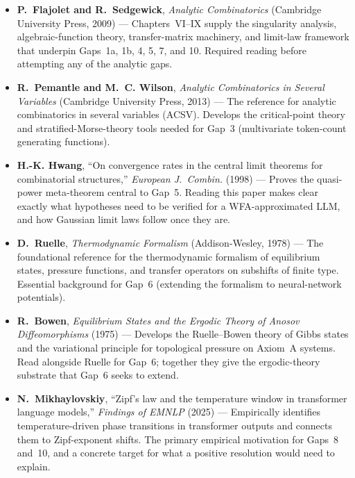 \begin{itemize}
  \item \textbf{P.~Flajolet and R.~Sedgewick}, \emph{Analytic Combinatorics} (Cambridge University Press, 2009) \cite{FlajoletSedgewick2009} --- Chapters~VI--IX supply the singularity analysis, algebraic-function theory, transfer-matrix machinery, and limit-law framework that underpin Gaps~1a, 1b, 4, 5, 7, and 10. Required reading before attempting any of the analytic gaps.

  \item \textbf{R.~Pemantle and M.~C. Wilson}, \emph{Analytic Combinatorics in Several Variables} (Cambridge University Press, 2013) \cite{PemantleWilson2013} --- The reference for analytic combinatorics in several variables (ACSV). Develops the critical-point theory and stratified-Morse-theory tools needed for Gap~3 (multivariate token-count generating functions).

  \item \textbf{H.-K. Hwang}, ``On convergence rates in the central limit theorems for combinatorial structures,'' \emph{European J.\ Combin.} (1998) \cite{Hwang1998} --- Proves the quasi-power meta-theorem central to Gap~5. Reading this paper makes clear exactly what hypotheses need to be verified for a WFA-approximated LLM, and how Gaussian limit laws follow once they are.

  \item \textbf{D.~Ruelle}, \emph{Thermodynamic Formalism} (Addison-Wesley, 1978) \cite{Ruelle1978} --- The foundational reference for the thermodynamic formalism of equilibrium states, pressure functions, and transfer operators on subshifts of finite type. Essential background for Gap~6 (extending the formalism to neural-network potentials).

  \item \textbf{R.~Bowen}, \emph{Equilibrium States and the Ergodic Theory of Anosov Diffeomorphisms} (1975) \cite{Bowen1975} --- Develops the Ruelle--Bowen theory of Gibbs states and the variational principle for topological pressure on Axiom~A systems. Read alongside Ruelle for Gap~6; together they give the ergodic-theory substrate that Gap~6 seeks to extend.

  \item \textbf{N.~Mikhaylovskiy}, ``Zipf's law and the temperature window in transformer language models,'' \emph{Findings of EMNLP} (2025) \cite{Mikhaylovskiy2025b} --- Empirically identifies temperature-driven phase transitions in transformer outputs and connects them to Zipf-exponent shifts. The primary empirical motivation for Gaps~8 and~10, and a concrete target for what a positive resolution would need to explain.
\end{itemize}
